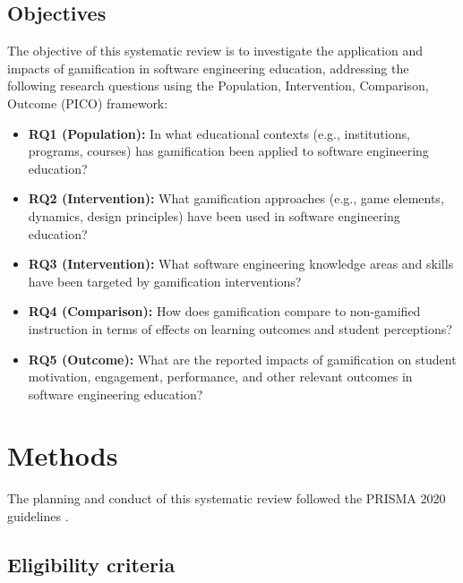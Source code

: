 \documentclass[
	hf,
	]{ceurart}
\begin{document}
		\subsection{Objectives}
		
		The objective of this systematic review is to investigate the application and impacts of gamification in software engineering education, addressing the following research questions using the Population, Intervention, Comparison, Outcome (PICO) framework:
		
		\begin{itemize}
			\item \textbf{RQ1 (Population):} In what educational contexts (e.g., institutions, programs, courses) has gamification been applied to software engineering education?
			\item \textbf{RQ2 (Intervention):} What gamification approaches (e.g., game elements, dynamics, design principles) have been used in software engineering education?
			\item \textbf{RQ3 (Intervention):} What software engineering knowledge areas and skills have been targeted by gamification interventions?
			\item \textbf{RQ4 (Comparison):} How does gamification compare to non-gamified instruction in terms of effects on learning outcomes and student perceptions? 
			\item \textbf{RQ5 (Outcome):} What are the reported impacts of gamification on student motivation, engagement, performance, and other relevant outcomes in software engineering education?
		\end{itemize}
		
		
		\section{Methods}
		
		The planning and conduct of this systematic review followed the PRISMA 2020 guidelines \citep{PageEtAl2021}.
		
		\subsection{Eligibility criteria}
		
\end{document}
